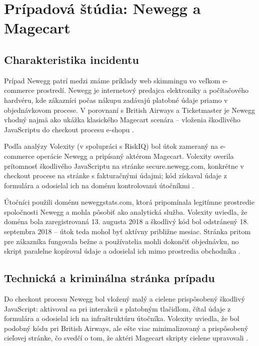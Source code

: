 \section{Prípadová štúdia: Newegg a Magecart}

\subsection{Charakteristika incidentu}

Prípad Newegg patrí medzi známe príklady web skimmingu vo veľkom e-commerce prostredí. Newegg je internetový predajca elektroniky a počítačového hardvéru, kde zákazníci počas nákupu zadávajú platobné údaje priamo v objednávkovom procese. V porovnaní s British Airways a Ticketmaster je Newegg vhodný najmä ako ukážka klasického Magecart scenára -- vloženia škodlivého JavaScriptu do checkout procesu e-shopu \cite{volexity2018Newegg,fortinet2019MagecartSkimmer}.

Podľa analýzy Volexity (v spolupráci s RiskIQ) bol útok zameraný na e-commerce operácie Newegg a pripísaný aktérom Magecart. Volexity overila prítomnosť škodlivého JavaScriptu na stránke secure.newegg.com, konkrétne v checkout procese na stránke s fakturačnými údajmi; kód získaval údaje z formulára a odosielal ich na doménu kontrolovanú útočníkmi \cite{volexity2018Newegg}.

Útočníci použili doménu neweggstats.com, ktorá pripomínala legitímne prostredie spoločnosti Newegg a mohla pôsobiť ako analytická služba. Volexity uviedla, že doména bola zaregistrovaná 13. augusta 2018 a škodlivý kód bol odstránený 18. septembra 2018 -- útok teda mohol byť aktívny približne mesiac. Stránka pritom pre zákazníka fungovala bežne a používatelia mohli dokončiť objednávku, no skript paralelne kopíroval údaje a odosielal ich mimo prostredia obchodníka \cite{volexity2018Newegg}.

\subsection{Technická a kriminálna stránka prípadu}

Do checkout procesu Newegg bol vložený malý a cielene prispôsobený škodlivý JavaScript: aktivoval sa pri interakcii s platobným tlačidlom, čítal údaje z formulára a odosielal ich na infraštruktúru útočníka. Volexity uviedla, že bol podobný kódu pri British Airways, ale ešte viac minimalizovaný a prispôsobený cieľovej stránke, čo svedčí o tom, že aktéri Magecart skripty cielene upravovali \cite{volexity2018Newegg}.

